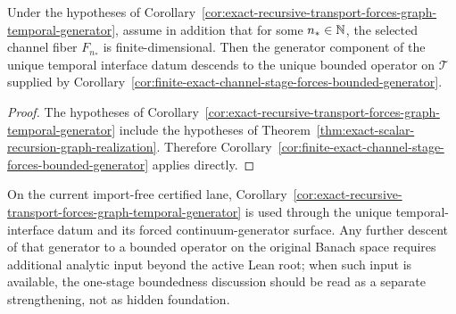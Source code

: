 \begin{corollary}
\label{cor:finite-exact-channel-stage-yields-bounded-temporal-generator}
Under the hypotheses of
Corollary~\ref{cor:exact-recursive-transport-forces-graph-temporal-generator},
assume in addition that for some \(n_\ast\in\mathbb{N}\), the selected channel fiber
\(F_{n_\ast}\) is finite-dimensional. Then the generator component of the
unique temporal interface datum descends to the unique bounded operator on
\(\mathcal T\) supplied by
Corollary~\ref{cor:finite-exact-channel-stage-forces-bounded-generator}.
\end{corollary}

\begin{proof}
The hypotheses of
Corollary~\ref{cor:exact-recursive-transport-forces-graph-temporal-generator}
include the hypotheses of
Theorem~\ref{thm:exact-scalar-recursion-graph-realization}. Therefore
Corollary~\ref{cor:finite-exact-channel-stage-forces-bounded-generator}
applies directly.
\end{proof}

\begin{remark}
\label{rem:exact-temporal-generator-after-one-stage-verification}
On the current import-free certified lane,
Corollary~\ref{cor:exact-recursive-transport-forces-graph-temporal-generator}
is used through the unique temporal-interface datum and its forced
continuum-generator surface. Any further descent of that generator to a
bounded operator on the original Banach space requires additional analytic
input beyond the active Lean root; when such input is available, the
one-stage boundedness discussion should be read as a separate strengthening,
not as hidden foundation.
\end{remark}

